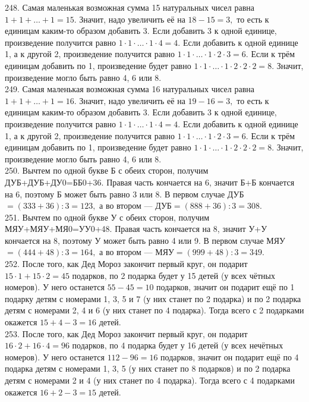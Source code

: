 248. Самая маленькая возможная сумма 15 натуральных чисел равна $1+1+\ldots+1=15.$ Значит, надо увеличить её на $18-15=3,$ то есть к единицам каким-то образом добавить 3. Если добавить 3 к одной единице, произведение получится равно $1\cdot1\cdot\ldots\cdot1\cdot4=4.$ Если добавить к одной единице 1, а к другой 2, произведение получится равно $1\cdot1\cdot\ldots\cdot1\cdot2\cdot3=6.$ Если к трём единицам добавить по 1, произведение будет равно $1\cdot1\cdot\ldots\cdot1\cdot2\cdot2\cdot2=8.$ Значит, произведение могло быть равно 4, 6 или 8.\\
249. Самая маленькая возможная сумма 16 натуральных чисел равна $1+1+\ldots+1=16.$ Значит, надо увеличить её на $19-16=3,$ то есть к единицам каким-то образом добавить 3. Если добавить 3 к одной единице, произведение получится равно $1\cdot1\cdot\ldots\cdot1\cdot4=4.$ Если добавить к одной единице 1, а к другой 2, произведение получится равно $1\cdot1\cdot\ldots\cdot1\cdot2\cdot3=6.$ Если к трём единицам добавить по 1, произведение будет равно $1\cdot1\cdot\ldots\cdot1\cdot2\cdot2\cdot2=8.$ Значит, произведение могло быть равно 4, 6 или 8.\\
250. Вычтем по одной букве Б с обеих сторон, получим ДУБ+ДУБ+ДУ0=ББ0+36. Правая часть кончается на 6, значит Б+Б кончается на 6, поэтому Б может быть равно 3 или 8. В первом случае ДУБ$=(333+36):3=123,$ а во втором --- ДУБ$=(888+36):3=308.$\\
251. Вычтем по одной букве У с обеих сторон, получим МЯУ+МЯУ+МЯ0=УУ0+48. Правая часть кончается на 8, значит У+У кончается на 8, поэтому У может быть равно 4 или 9. В первом случае МЯУ$=(444+48):3=164,$ а во втором --- МЯУ$=(999+48):3=349.$\\
252. После того, как Дед Мороз закончит первый круг, он подарит $15\cdot1+15\cdot2=45$ подарков, по 2 подарка будет у 15 детей (у всех чётных номеров). У него останется $55-45=10$ подарков, значит он подарит ещё по 1 подарку детям с номерами 1, 3, 5 и 7 (у них станет по 2 подарка) и по 2 подарка детям с номерами 2, 4 и 6 (у них станет по 4 подарка). Тогда всего с 2 подарками окажется $15+4-3=16$ детей.\\
253. После того, как Дед Мороз закончит первый круг, он подарит $16\cdot2+16\cdot4=96$ подарков, по 4 подарка будет у 16 детей (у всех нечётных номеров). У него останется $112-96=16$ подарков, значит он подарит ещё по 4 подарка детям с номерами 1, 3, 5 (у них станет по 8 подарков) и по 2 подарка детям с номерами 2 и 4 (у них станет по 4 подарка). Тогда всего с 4 подарками окажется $16+2-3=15$ детей.\\
